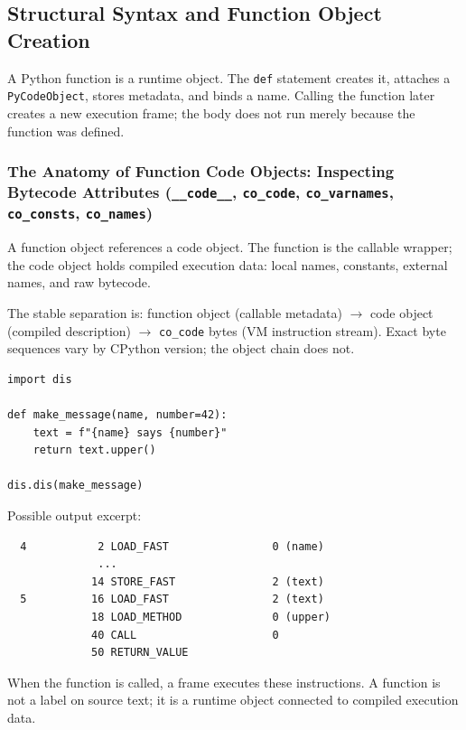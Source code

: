 \subsection{Structural Syntax and Function Object Creation}

A Python function is a runtime object. The \texttt{def} statement creates it, attaches a \texttt{PyCodeObject}, stores metadata, and binds a name. Calling the function later creates a new execution frame; the body does not run merely because the function was defined.

\subsubsection{The Anatomy of Function Code Objects: Inspecting Bytecode Attributes (\texttt{\_\_code\_\_}, \texttt{co\_code}, \texttt{co\_varnames}, \texttt{co\_consts}, \texttt{co\_names})}

A function object references a code object. The function is the callable wrapper; the code object holds compiled execution data: local names, constants, external names, and raw bytecode.



The stable separation is: function object (callable metadata) $\rightarrow$ code object (compiled description) $\rightarrow$ \texttt{co\_code} bytes (VM instruction stream). Exact byte sequences vary by CPython version; the object chain does not.

\begin{verbatim}
import dis

def make_message(name, number=42):
    text = f"{name} says {number}"
    return text.upper()

dis.dis(make_message)
\end{verbatim}

Possible output excerpt:

\begin{verbatim}
  4           2 LOAD_FAST                0 (name)
              ...
             14 STORE_FAST               2 (text)
  5          16 LOAD_FAST                2 (text)
             18 LOAD_METHOD              0 (upper)
             40 CALL                     0
             50 RETURN_VALUE
\end{verbatim}

When the function is called, a frame executes these instructions. A function is not a label on source text; it is a runtime object connected to compiled execution data.

